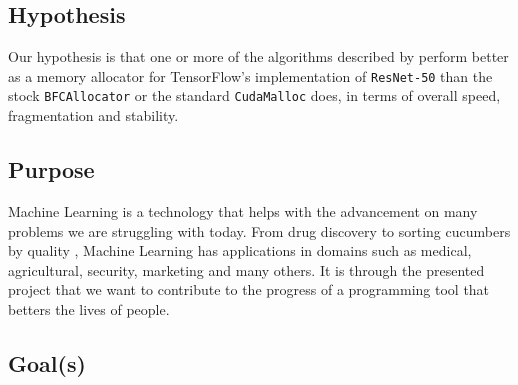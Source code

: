 \documentclass[12pt,twoside]{article}
\begin{document}


\subsection{Hypothesis}
\label{sec:hypothesis}


Our hypothesis is that one or more of the algorithms described by \citeauthor{Vinkler2015} \cite{Vinkler2015} perform better as a memory allocator for TensorFlow's implementation of \texttt{ResNet-50} than the stock \texttt{BFCAllocator} or the standard \texttt{CudaMalloc} does, in terms of overall speed, fragmentation and stability.


\subsection{Purpose}
\label{sec:purpose}


Machine Learning is a technology that helps with the advancement on many problems we are struggling with today. From drug discovery \cite{Ramsundar_Kearnes_Riley_Webster_Konerding_Pande_2015} to sorting cucumbers by quality \cite{cucumber}, Machine Learning has applications in domains such as medical, agricultural, security, marketing and many others. It is through the presented project that we want to contribute to the progress of a programming tool that betters the lives of people.

\subsection{Goal(s)}
\label{sec:goal(s)}
\end{document}
